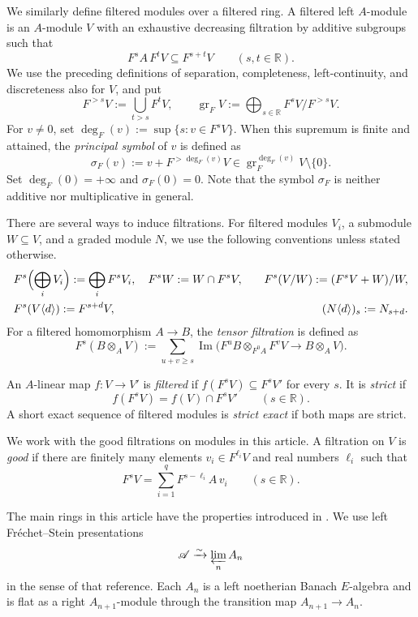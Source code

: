 \documentclass[11pt]{article}
\theoremstyle{definition}
\newcommand{\gr}{\operatorname{gr}}
\newcommand{\im}{\operatorname{Im}}
\begin{document}
We similarly define filtered modules over a filtered ring.
A filtered left $A$-module is an $A$-module $V$ with an exhaustive
decreasing filtration by additive subgroups such that
\[
 F^sA\,F^tV\subseteq F^{s+t}V\qquad(s,t\in\mathbb R).
\]
We use the preceding definitions of separation, completeness,
left-continuity, and discreteness also for $V$, and put
\[
 F^{>s}V:=\bigcup_{t>s}F^tV,\qquad
 \gr_FV:=\bigoplus_{s\in\mathbb R}F^sV/F^{>s}V.
\]
For $v\neq0$, set $\deg_F(v):=\sup\{s:v\in F^sV\}$.
When this supremum is finite and attained, the \emph{principal symbol}
of $v$ is defined as
\[
 \sigma_F(v):=v+F^{>\deg_F(v)}V
       \in\gr_F^{\deg_F(v)}V\setminus\{0\}.
\]
Set $\deg_F(0)=+\infty$ and $\sigma_F(0)=0$.
Note that the symbol $\sigma_F$ is neither additive nor multiplicative in general. 

There are several ways to induce filtrations.
For filtered modules $V_i$, a submodule $W\subseteq V$, and a graded
module $N$, we use the following conventions
unless stated otherwise.
\[
 \begin{aligned}
 &F^s\Bigl(\bigoplus_iV_i\Bigr):=\bigoplus_iF^sV_i,\quad
 F^sW:=W\cap F^sV,\quad
 &F^s(V/W):=(F^sV+W)/W,\\
 &F^s(V\langle d\rangle):=F^{s+d}V,
 &(N\langle d\rangle)_s:=N_{s+d}.
 \end{aligned}
\]
For a filtered homomorphism $A\to B$, the \emph{tensor filtration} is defined as 
\[
 F^s(B\otimes_AV):=
 \sum_{u+v\geq s}\im\bigl(F^uB\otimes_{F^0A}F^vV
                              \longrightarrow B\otimes_AV\bigr).
\]


An $A$-linear map $f:V\to V'$ is \emph{filtered} if
$f(F^sV)\subseteq F^sV'$ for every $s$. It is \emph{strict} if
\[
 f(F^sV)=f(V)\cap F^sV'\qquad(s\in\mathbb R).
\]
A short exact sequence of filtered modules is \emph{strict exact}
if both maps are strict.

We work with the good filtrations on modules in this article.
A filtration on $V$ is \emph{good} if there are finitely many elements
$v_i\in F^{\ell_i}V$ and real numbers $\ell_i$ such that
\[
 F^sV=\sum_{i=1}^qF^{s-\ell_i}A\,v_i
 \qquad(s\in\mathbb R).
\]

The main rings in this article have the properties introduced in
\cite[\S3]{ST03}. We use left Fr\'echet--Stein presentations
\[
 \mathscr A\xrightarrow{\sim}\varprojlim_n A_n
\]
in the sense of that reference. Each $A_n$ is a left noetherian
Banach $E$-algebra and is flat as a right $A_{n+1}$-module through
the transition map $A_{n+1}\to A_n$.
\end{document}
